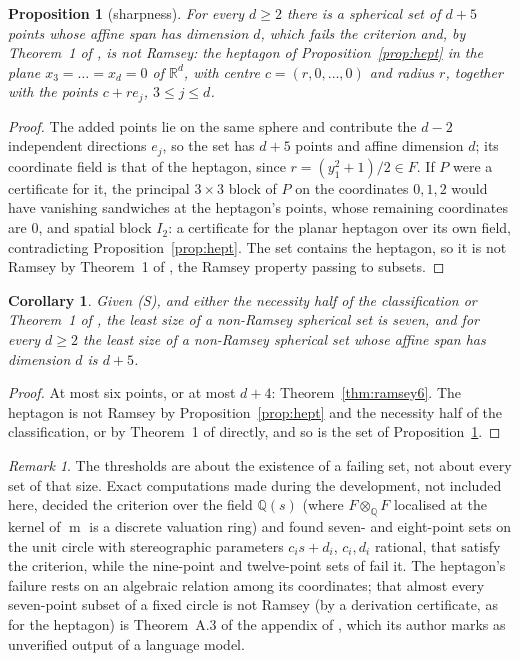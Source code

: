 \documentclass[11pt]{article}
\newtheorem{proposition}[theorem]{Proposition}
\newtheorem{corollary}[theorem]{Corollary}
\theoremstyle{definition}
\theoremstyle{remark}
\newtheorem{remark}[theorem]{Remark}
\newcommand{\R}{\mathbb{R}}
\newcommand{\Q}{\mathbb{Q}}
\DeclareMathOperator{\m}{m}
\begin{document}
\begin{proposition}[sharpness]\label{prop:sharp}
For every $d \geq 2$ there is a spherical set of $d + 5$ points whose affine span has dimension $d$,
which fails the criterion and, by Theorem~1 of \cite{palvolgyi}, is not Ramsey: the heptagon of
Proposition~\ref{prop:hept} in the plane
$x_3 = \dots = x_d = 0$ of $\R^d$, with centre $c = (r, 0, \dots, 0)$ and radius $r$, together with the
points $c + r e_j$, $3 \leq j \leq d$.
\end{proposition}

\begin{proof}
The added points lie on the same sphere and contribute the $d - 2$ independent directions $e_j$, so
the set has $d + 5$ points and affine dimension $d$; its coordinate field is that of the heptagon,
since $r = (y_1^2 + 1)/2 \in F$. If $P$ were a certificate for it, the principal $3 \times 3$ block of $P$
on the coordinates $0, 1, 2$ would have vanishing sandwiches at the heptagon's points, whose remaining
coordinates are $0$, and spatial block $I_2$: a certificate for the planar heptagon over its own field,
contradicting Proposition~\ref{prop:hept}. The set contains the heptagon, so it is not Ramsey by
Theorem~1 of \cite{palvolgyi}, the Ramsey property passing to subsets.
\end{proof}

\begin{corollary}
Given (S), and either the necessity half of the classification or Theorem~1 of \cite{palvolgyi}, the
least size of a non-Ramsey spherical set is seven, and for every $d \geq 2$ the least size of a
non-Ramsey spherical set whose affine span has dimension $d$ is $d + 5$.
\end{corollary}

\begin{proof}
At most six points, or at most $d + 4$: Theorem~\ref{thm:ramsey6}. The heptagon is not Ramsey by
Proposition~\ref{prop:hept} and the necessity half of the classification, or by Theorem~1 of
\cite{palvolgyi} directly, and so is the set of Proposition~\ref{prop:sharp}.
\end{proof}

\begin{remark}
The thresholds are about the existence of a failing set, not about every set of that size. Exact
computations made during the development, not included here, decided the criterion over the field
$\Q(s)$ (where $F \otimes_\Q F$ localised at the kernel of $\m$ is a discrete valuation ring) and found
seven- and eight-point sets on the unit circle with stereographic parameters $c_i s + d_i$, $c_i, d_i$
rational, that satisfy the criterion, while the nine-point and twelve-point sets of \cite{oai} fail it.
The heptagon's failure rests on an algebraic relation among its coordinates; that almost every
seven-point subset of a fixed circle is not Ramsey (by a derivation certificate, as for the heptagon) is
Theorem~A.3 of the appendix of \cite{palvolgyi}, which its author marks as unverified output of a
language model.
\end{remark}
\end{document}
